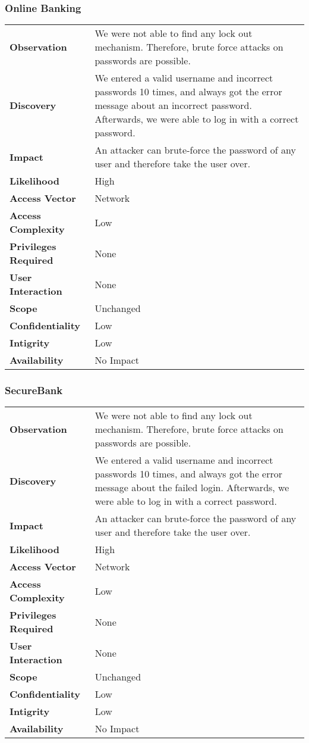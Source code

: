 \subsubsection*{Online Banking}

\begin{tabular}{l|p{10cm}}

\textbf{Observation} & We were not able to find any lock out mechanism. Therefore, brute force attacks on passwords are possible. \\
\textbf{Discovery} & We entered a valid username and incorrect passwords 10 times, and always got the error message about an incorrect password. Afterwards, we were able to log in with a correct password. \\
\textbf{Impact} & An attacker can brute-force the password of any user and therefore take the user over. \\
\textbf{Likelihood} & High \\
\textbf{Access Vector} & Network \\
\textbf{Access Complexity} & Low \\
\textbf{Privileges Required} & None \\
\textbf{User Interaction} & None \\
\textbf{Scope} & Unchanged \\
\textbf{Confidentiality} & Low \\
\textbf{Intigrity} & Low \\
\textbf{Availability} & No Impact \\
\end{tabular}

\subsubsection*{SecureBank}

\begin{tabular}{l|p{10cm}}

\textbf{Observation} & We were not able to find any lock out mechanism. Therefore, brute force attacks on passwords are possible. \\
\textbf{Discovery} & We entered a valid username and incorrect passwords 10 times, and always got the error message about the failed login. Afterwards, we were able to log in with a correct password. \\
\textbf{Impact} & An attacker can brute-force the password of any user and therefore take the user over. \\
\textbf{Likelihood} & High \\
\textbf{Access Vector} & Network \\
\textbf{Access Complexity} & Low \\
\textbf{Privileges Required} & None \\
\textbf{User Interaction} & None \\
\textbf{Scope} & Unchanged \\
\textbf{Confidentiality} & Low \\
\textbf{Intigrity} & Low \\
\textbf{Availability} & No Impact \\
\end{tabular}


